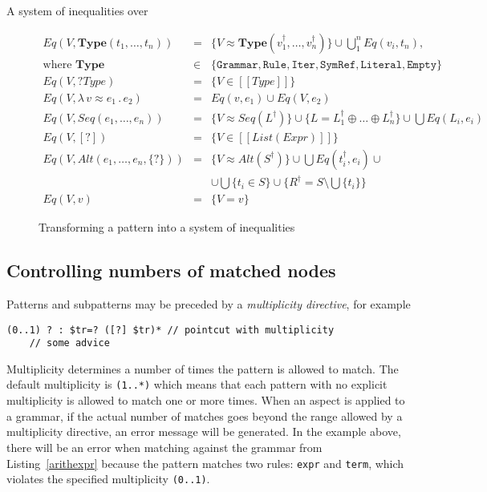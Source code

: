 \documentclass{IOS-Book-Article}     %
\newcommand{\abstr}[3]{\lambda \, #1 \approx #2 \,.\, #3}
\newcommand{\sem}[1]{[\![#1]\!]}
\newcommand{\lstref}[1]{Listing~\ref{#1}}
\begin{document}
A system of inequalities over 

\newcommand{\fresh}[1]{#1^\dagger}
\begin{figure}%
\centering%
$$
\begin{array}{rcl}
Eq(V, \mathbf{Type}(t_1, \ldots, t_n)) &=& \{V \approx \mathbf{Type}(\fresh{v_1}, \ldots, \fresh{v_n})\} \cup 
\bigcup_1^n Eq(v_i, t_n),\\
\mbox{where } \mathbf{Type} &\in& \{
	\mathtt{Grammar}, \mathtt{Rule}, \mathtt{Iter}, \mathtt{SymRef}, \mathtt{Literal}, \mathtt{Empty}\}\\

Eq(V, ?Type) &=& \{V \in \sem{Type}\}\\

Eq(V, \abstr{v}{e_1}{e_2}) &=& Eq(v, e_1) \cup Eq(V, e_2)\\

Eq(V, Seq(e_1, \ldots, e_n)) &=& \{V \approx Seq(\fresh{L})\} \cup \{ L = \fresh{L_1} \oplus \ldots \oplus \fresh{L_n}\} \cup \bigcup Eq(L_i, e_i)\\

Eq(V, [?]) &=& \{ V \in \sem{List(Expr)} \}\\

Eq(V, Alt(e_1, \ldots, e_n, \{?\})) &=& \{V \approx Alt(\fresh{S})\}
                                   \cup \bigcup Eq(\fresh{t_i}, e_i) \cup \\
                               &&    
                                   \cup \bigcup \{ t_i \in S\}
                                   \cup \{ \fresh{R} = S \setminus
                                                          \bigcup\{t_i\}\}\\
Eq(V, v) &=& \{V = v\}
\end{array}
$$
\caption{Transforming a pattern into a system of inequalities}\label{Eq}%
\end{figure}%

\subsection{Controlling numbers of matched nodes}
Patterns and subpatterns may be preceded by a \emph{multiplicity directive}, for example
\begin{lstlisting}[language=Grammatic]
(0..1) ? : $tr=? ([?] $tr)* // pointcut with multiplicity
    // some advice
\end{lstlisting}
Multiplicity determines a number of times the pattern is allowed to match. The default multiplicity is \texttt{(1..*)} which means that each pattern with no explicit multiplicity is allowed to match one or more times. When an aspect is applied to a grammar, if the actual number of matches goes beyond the range allowed by a multiplicity directive, an error message will be generated. In the example above, there will be an error when matching against the grammar from \lstref{arithexpr} because the pattern matches two rules: \texttt{expr} and \texttt{term}, which violates the specified multiplicity \texttt{(0..1)}.
\end{document}
